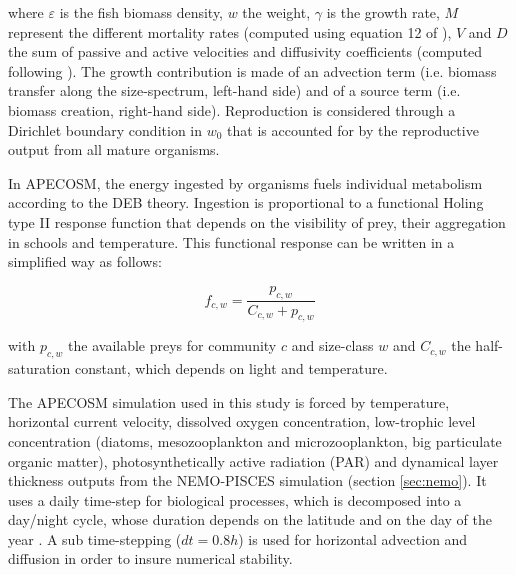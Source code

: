 where $\varepsilon$  is the fish biomass density, $w$ the weight, $\gamma$ is the growth rate, $M$ represent the different mortality rates (computed using equation 12 of \citealt{mauryIndividualsPopulationsCommunities2013}), $V$ and $D$ the sum of passive and active velocities and diffusivity coefficients (computed following \citealt{faugerasAdvectiondiffusionreactionSizestructuredFish2005}). The growth contribution is made of an advection term (i.e. biomass transfer along the size-spectrum, left-hand side) and of a source term (i.e. biomass creation, right-hand side). Reproduction is considered through a Dirichlet boundary condition in $w_0$ that is accounted for by the reproductive output from all mature organisms.

In APECOSM, the energy ingested by organisms fuels individual metabolism according to the DEB theory. Ingestion is proportional to a functional Holing type II response function that depends on the visibility of prey, their aggregation in schools and temperature. This functional response can be written in a simplified way as follows:

\begin{displaymath}
f_{c, w} = \frac{p_{c, w}}{C_{c, w} + p_{c, w}}
\end{displaymath}

with $p_{c, w}$ the available preys for community $c$ and size-class $w$ and $C_{c, w}$ the half-saturation constant, which depends on light and temperature.



The APECOSM simulation used in this study is forced by temperature, horizontal current velocity, dissolved oxygen concentration, low-trophic level concentration (diatoms, mesozooplankton and microzooplankton, big particulate organic matter), photosynthetically active radiation (PAR) and dynamical layer thickness outputs from the NEMO-PISCES simulation (section \ref{sec:nemo}). It uses a daily time-step for biological processes, which is decomposed into a day/night cycle, whose duration depends on the latitude and on the day of the year \citep{forsytheModelComparisonDaylength1995}. A sub time-stepping ($dt =0.8h$) is used for horizontal advection and diffusion in order to insure numerical stability.

